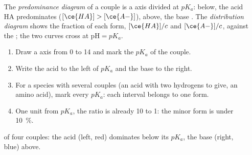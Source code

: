 \begin{definition}\label{def:g12:buffers-predominance:predominance}
The \emph{predominance diagram} of a couple
is a  axis divided at $pK_a$: below, the acid HA predominates
($[\ce{HA}] > [\ce{A-}]$), above, the base . The \emph{distribution
diagram} shows the fraction of each form,
$[\ce{HA}]/c$ and $[\ce{A-}]/c$, against the ; the two curves cross at
$\mathrm{pH} = pK_a$.
\end{definition}

\begin{method}\label{met:g12:buffers-predominance:diagram}
\begin{enumerate}
  \item Draw a  axis from 0 to 14 and mark the $pK_a$ of the couple.
  \item Write the acid to the left of $pK_a$ and the base to the right.
  \item For a species with several couples (an acid with two hydrogens to
        give, an amino acid), mark every $pK_a$: each interval belongs to
        one form.
  \item One unit from $pK_a$, the ratio is already 10 to 1: the minor
        form is under \qty{10}{\percent}.
\end{enumerate}
\end{method}

\begin{omfigure}

{\small {} of four couples: the acid (left, red)
dominates below its $pK_a$, the base (right, blue) above.}
\end{omfigure}


